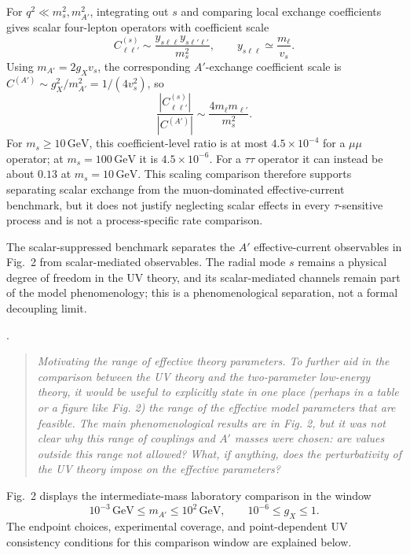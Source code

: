 \documentclass[12pt,a4paper]{article}
\begin{document}
For \(q^2\ll m_s^2,m_{A'}^2\), integrating out \(s\) and comparing local exchange coefficients gives scalar four-lepton operators with coefficient scale
\[
C_{\ell\ell'}^{(s)}\sim\frac{y_{s\ell\ell}y_{s\ell'\ell'}}{m_s^2},
\qquad y_{s\ell\ell}\simeq\frac{m_\ell}{v_s}.
\]
Using \(m_{A'}=2g_Xv_s\), the corresponding \(A'\)-exchange coefficient scale is \(C^{(A')}\sim g_X^2/m_{A'}^2=1/(4v_s^2)\), so
\[
\frac{|C_{\ell\ell'}^{(s)}|}{|C^{(A')}|}
\sim\frac{4m_\ell m_{\ell'}}{m_s^2}.
\]
For \(m_s\geq10\,\mathrm{GeV}\), this coefficient-level ratio is at most \(4.5\times10^{-4}\) for a \(\mu\mu\) operator; at \(m_s=100\,\mathrm{GeV}\) it is \(4.5\times10^{-6}\). For a \(\tau\tau\) operator it can instead be about \(0.13\) at \(m_s=10\,\mathrm{GeV}\). This scaling comparison therefore supports separating scalar exchange from the muon-dominated effective-current benchmark, but it does not justify neglecting scalar effects in every \(\tau\)-sensitive process and is not a process-specific rate comparison.

The scalar-suppressed benchmark separates the \(A'\) effective-current observables in Fig.~2 from scalar-mediated observables. The radial mode \(s\) remains a physical degree of freedom in the UV theory, and its scalar-mediated channels remain part of the model phenomenology; this is a phenomenological separation, not a formal decoupling limit.



\medskip
{}. \begin{quote}\itshape
Motivating the range of effective theory parameters. To further aid in the comparison between the UV theory and the two-parameter low-energy theory, it would be useful to explicitly state in one place (perhaps in a table or a figure like Fig. 2) the range of the effective model parameters that are feasible. The main phenomenological results are in Fig. 2, but it was not clear why this range of couplings and \(A'\) masses were chosen: are values outside this range not allowed? What, if anything, does the perturbativity of the UV theory impose on the effective parameters?\end{quote}

Fig.~2 displays the intermediate-mass laboratory comparison in the window
\[
10^{-3}\,\mathrm{GeV}\leq m_{A'}\leq10^2\,\mathrm{GeV},
\qquad
10^{-6}\leq g_X\leq1.
\]
The endpoint choices, experimental coverage, and point-dependent UV consistency conditions for this comparison window are explained below.
\end{document}
